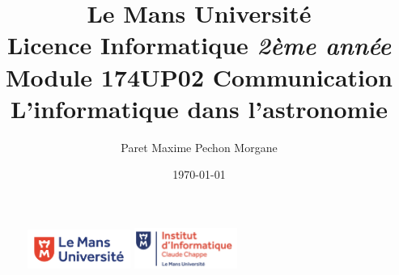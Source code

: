 \documentclass[a4paper,11pt]{article}
\begin{document}
\begin {figure}
\includegraphics[width=0.3\textwidth]{image/logo/logo_lemans.png}
\hspace{150pt} 
\includegraphics[width=0.3\textwidth] {image/logo/logo_ic2.png}
\end {figure}
\title {\textbf {\color {blue} Le Mans Université}\color{black}
\\  Licence Informatique  \textit {2ème année}
 \\Module 174UP02 Communication
 \\ \textbf {L'informatique dans l'astronomie}}
\author{Paret Maxime Pechon Morgane}
\date{\today} 
\maketitle 
\newpage
\tableofcontents
\newpage
\end{document}
